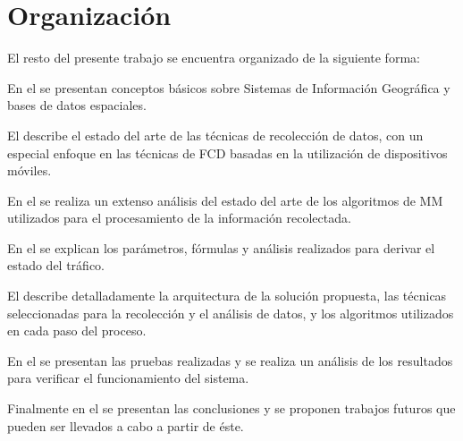 \section{Organización}

El resto del presente trabajo se encuentra organizado de la siguiente forma:

En el  se presentan conceptos básicos sobre Sistemas de Información Geográfica y bases de datos espaciales.

El  describe el estado del arte de las técnicas de recolección de datos, con un especial enfoque en las técnicas de FCD basadas en la utilización de dispositivos móviles. 

En el  se realiza un extenso análisis del estado del arte de los algoritmos de MM utilizados para el procesamiento de la información recolectada.

En el  se explican los parámetros, fórmulas y análisis realizados para derivar el estado del tráfico.

El  describe detalladamente la arquitectura de la solución propuesta, las técnicas seleccionadas para la recolección y el análisis de datos, y los algoritmos utilizados en cada paso del proceso.

En el  se presentan las pruebas realizadas y se realiza un análisis de los resultados para verificar el funcionamiento del sistema.

Finalmente en el  se presentan las conclusiones y se proponen trabajos futuros que pueden ser llevados a cabo a partir de éste.
